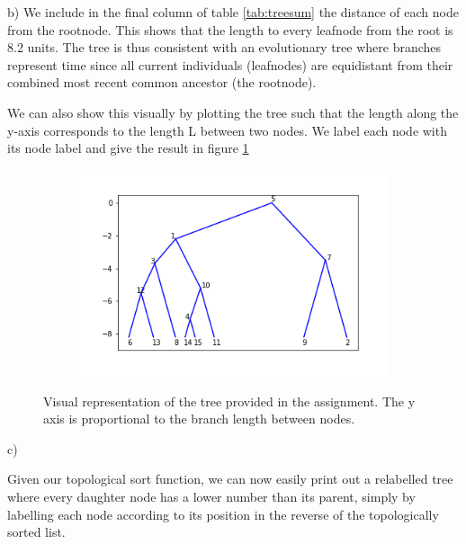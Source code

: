\documentclass{article}
\begin{document}
b)
We include in the final column of table \ref{tab:treesum} the distance of each node from the rootnode. This shows that the length to every leafnode from the root is 8.2 units. The tree is thus consistent with an evolutionary tree where branches represent time since all current individuals (leafnodes) are equidistant from their combined most recent common ancestor (the rootnode).

We can also show this visually by plotting the tree such that the length along the y-axis corresponds to the length L between two nodes. We label each node with its node label and give the result in figure \ref{fig:tree}

\begin{figure}[h]
	\centering
	\begin{subfigure}[t]{0.55\linewidth}
		\centering
		\includegraphics[width = 1.0\linewidth, trim={50 35 30 30}, clip=true]{figures/tree.png}
	\end{subfigure}
\caption{Visual representation of the tree provided in the assignment. The y axis is proportional to the branch length between nodes.}
\label{fig:tree}
\end{figure}

\newpage

c)

Given our topological sort function, we can now easily print out a relabelled tree where every daughter node has a lower number than its parent, simply by labelling each node according to its position in the reverse of the topologically sorted list.
\end{document}
